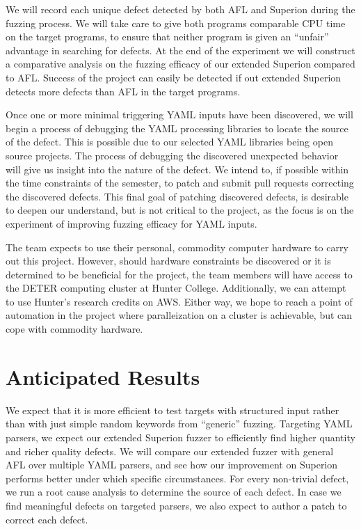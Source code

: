 \documentclass[12pt]{diazessay}
\begin{document}
We will record each unique defect detected by both AFL and Superion during the fuzzing process.
We will take care to give both programs comparable CPU time on the target programs, to ensure that neither program is given an ``unfair'' advantage in searching for defects.
At the end of the experiment we will construct a comparative analysis on the fuzzing efficacy of our extended Superion compared to AFL.
Success of the project can easily be detected if out extended Superion detects more defects than AFL in the target programs.

Once one or more minimal triggering YAML inputs have been discovered, we will begin a process of debugging the YAML processing libraries to locate the source of the defect.
This is possible due to our selected YAML libraries being open source projects.
The process of debugging the discovered unexpected behavior will give us insight into the nature of the defect.
We intend to, if possible within the time constraints of the semester, to patch and submit pull requests correcting the discovered defects.
This final goal of patching discovered defects, is desirable to deepen our understand, but is not critical to the project, as the focus is on the experiment of improving fuzzing efficacy for YAML inputs.

The team expects to use their personal, commodity computer hardware to carry out this project.
However, should hardware constraints be discovered or it is determined to be beneficial for the project, the team members will have access to the DETER computing cluster at Hunter College.
Additionally, we can attempt to use Hunter's research credits on AWS.
Either way, we hope to reach a point of automation in the project where paralleization on a cluster is achievable, but can cope with commodity hardware.


\section*{Anticipated Results}
\label{results}

We expect that it is more efficient to test targets with structured input rather than with just simple random keywords from ``generic'' fuzzing.
Targeting YAML parsers, we expect our extended Superion fuzzer to efficiently find higher quantity and richer quality defects.
We will compare our extended fuzzer with general AFL over multiple YAML parsers, and see how our improvement on Superion performs better under which specific circumstances.
For every non-trivial defect, we run a root cause analysis to determine the source of each defect.
In case we find meaningful defects on targeted parsers, we also expect to author a patch to correct each defect.
\end{document}
